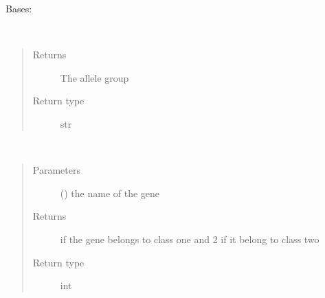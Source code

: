 \documentclass[letterpaper,10pt,english]{sphinxmanual}
\begin{document}
\begin{fulllineitems}
\label{\detokenize{IPTK.Classes:IPTK.Classes.HLAChain.HLAChain}}
Bases: 

\begin{fulllineitems}
\label{\detokenize{IPTK.Classes:IPTK.Classes.HLAChain.HLAChain.get_allele_group}}~\begin{quote}\begin{description}
\item[{Returns}] \leavevmode
The allele group

\item[{Return type}] \leavevmode
str

\end{description}\end{quote}

\end{fulllineitems}


\begin{fulllineitems}
\label{\detokenize{IPTK.Classes:IPTK.Classes.HLAChain.HLAChain.get_chain_class}}~\begin{quote}\begin{description}
\item[{Parameters}] \leavevmode
{} () \textendash{} the name of the gene

\item[{Returns}]  if the gene belongs to class one and 2 if it belong to class two

\item[{Return type}] \leavevmode
int


\end{description}
\end{quote}
\end{fulllineitems}
\end{fulllineitems}
\end{document}
